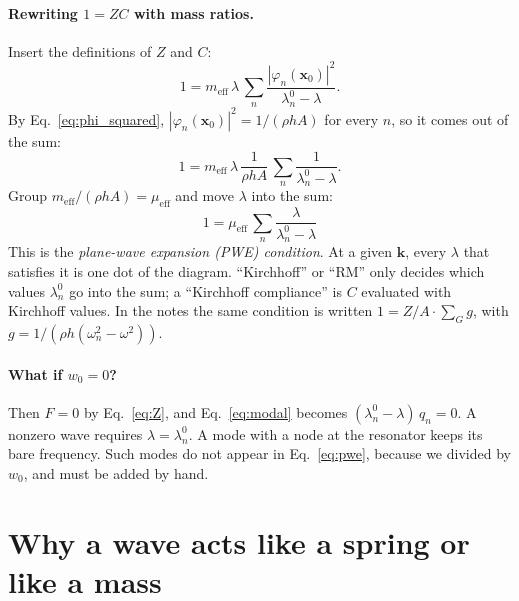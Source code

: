 \paragraph{Rewriting $1 = ZC$ with mass ratios.}
Insert the definitions of $Z$ and $C$:
\begin{equation}
  1 = m_\mathrm{eff}\,\lambda\,\sum_n \frac{|\varphi_n(\mathbf{x}_0)|^2}{\lambda_n^0 - \lambda} .
\end{equation}
By Eq.~\eqref{eq:phi_squared}, $|\varphi_n(\mathbf{x}_0)|^2 = 1/(\rho h A)$ for
every $n$, so it comes out of the sum:
\begin{equation}
  1 = m_\mathrm{eff}\,\lambda\,\frac{1}{\rho h A}\,\sum_n \frac{1}{\lambda_n^0 - \lambda} .
\end{equation}
Group $m_\mathrm{eff}/(\rho h A) = \mu_\mathrm{eff}$ and move $\lambda$ into the
sum:
\begin{equation}
  \boxed{\;1 = \mu_\mathrm{eff}\,\sum_n \frac{\lambda}{\lambda_n^0 - \lambda}\;}
  \label{eq:pwe}
\end{equation}
This is the \emph{plane-wave expansion (PWE) condition}. At a given $\mathbf{k}$,
every $\lambda$ that satisfies it is one dot of the diagram. ``Kirchhoff'' or
``RM'' only decides which values $\lambda_n^0$ go into the sum; a ``Kirchhoff
compliance'' is $C$ evaluated with Kirchhoff values. In the notes the same
condition is written $1 = Z/A\cdot\sum_G g$, with
$g = 1/(\rho h(\omega_n^2 - \omega^2))$.

\paragraph{What if $w_0 = 0$?}
Then $F = 0$ by Eq.~\eqref{eq:Z}, and Eq.~\eqref{eq:modal} becomes
$(\lambda_n^0 - \lambda)\, q_n = 0$. A nonzero wave requires
$\lambda = \lambda_n^0$. A mode with a node at the resonator keeps its bare
frequency. Such modes do not appear in Eq.~\eqref{eq:pwe}, because we divided
by $w_0$, and must be added by hand.

\section{Why a wave acts like a spring or like a mass}


